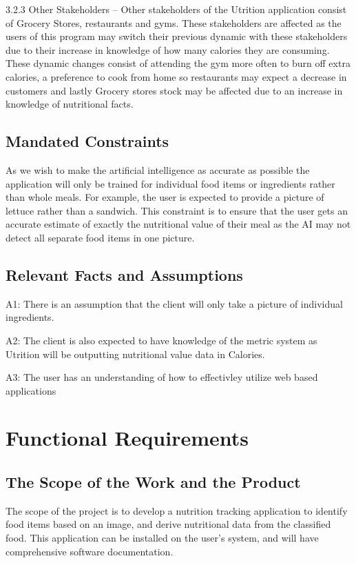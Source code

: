 \documentclass[12pt]{article}
\begin{document}
3.2.3 Other Stakeholders – Other stakeholders of the Utrition application consist of Grocery Stores, restaurants and gyms. These stakeholders are affected as the users of this program may switch their previous dynamic with these stakeholders due to their increase in knowledge of how many calories they are consuming. These dynamic changes consist of attending the gym more often to burn off extra calories, a preference to cook from home so restaurants may expect a decrease in customers and lastly Grocery stores stock may be affected due to an increase in knowledge of nutritional facts. 

\subsection{Mandated Constraints} 

As we wish to make the artificial intelligence as accurate as possible the application will only be trained for individual food items or ingredients rather than whole meals. For example, the user is expected to provide a picture of lettuce rather than a sandwich. This constraint is to ensure that the user gets an accurate estimate of exactly the nutritional value of their meal as the AI may not detect all separate food items in one picture. 

\subsection{Relevant Facts and Assumptions } 


A1: There is an assumption that the client will only take a picture of individual ingredients. 

A2: The client is also expected to have knowledge of the metric system as Utrition will be outputting nutritional value data in Calories.

A3: The user has an understanding of how to effectivley utilize web based applications

\section{Functional Requirements}

\subsection{The Scope of the Work and the Product}

The scope of the project is to develop a nutrition tracking application to identify food items based on an image, and derive nutritional data from the classified food. This application can be installed on the user's system, and will have comprehensive software documentation.
\end{document}
